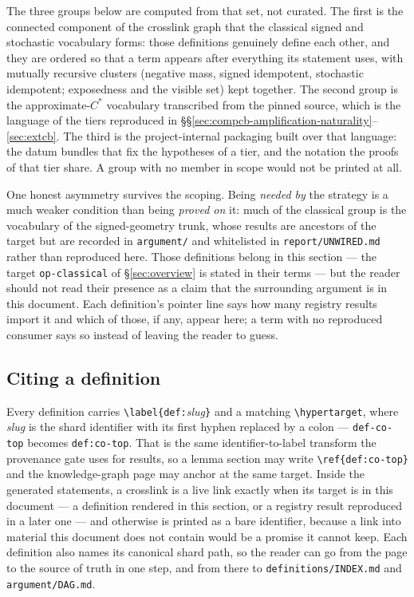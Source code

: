 The three groups below are computed from that set, not curated. The first is the connected
component of the crosslink graph that the classical signed and stochastic vocabulary forms:
those definitions genuinely define each other, and they are ordered so that a term appears
after everything its statement uses, with mutually recursive clusters
(negative mass, signed idempotent, stochastic idempotent; exposedness and the visible set)
kept together. The second group is the approximate-$C^{*}$ vocabulary transcribed from the
pinned source, which is the language of the tiers reproduced in
\S\S\ref{sec:compcb-amplification-naturality}--\ref{sec:extcb}. The third is the
project-internal packaging built over that language: the datum bundles that fix the
hypotheses of a tier, and the notation the proofs of that tier share. A group with no
member in scope would not be printed at all.

One honest asymmetry survives the scoping. Being \emph{needed by} the strategy is a much
weaker condition than being \emph{proved on} it: much of the classical group is the
vocabulary of the signed-geometry trunk, whose results are ancestors of the target but are
recorded in \texttt{argument/} and whitelisted in \texttt{report/UNWIRED.md} rather than
reproduced here. Those definitions belong in this section --- the target
\texttt{op-classical} of \S\ref{sec:overview} is stated in their terms --- but the reader
should not read their presence as a claim that the surrounding argument is in this
document. Each definition's pointer line says how many registry results import it and which
of those, if any, appear here; a term with no reproduced consumer says so instead of
leaving the reader to guess.

\subsection*{Citing a definition}

Every definition carries \texttt{\textbackslash label\{def:}\textit{slug}\texttt{\}} and a matching
\texttt{\textbackslash hypertarget}, where \textit{slug} is the shard identifier with its
first hyphen replaced by a colon --- \texttt{def-co-top} becomes \texttt{def:co-top}. That
is the same identifier-to-label transform the provenance gate uses for results, so a lemma
section may write \texttt{\textbackslash ref\{def:co-top\}} and the knowledge-graph page
may anchor at the same target. Inside the generated statements, a crosslink is a live link
exactly when its target is in this document --- a definition rendered in this section, or a
registry result reproduced in a later one --- and otherwise is printed as a bare identifier,
because a link into material this document does not contain would be a promise it cannot
keep. Each definition also names its canonical shard path, so the reader can go from the
page to the source of truth in one step, and from there to
\texttt{definitions/INDEX.md} and \texttt{argument/DAG.md}.


